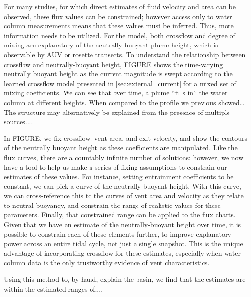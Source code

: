For many studies, for which direct estimates of fluid velocity and area can be observed, these flux values can be constrained; however access only to water column measurements means that these values must be inferred. Thus, more information needs to be utilized. For the \PHUMES model, both crossflow and degree of mixing are explanatory of the neutrally-buoyant plume height, which is observable by AUV or rosette transects. To understand the relationship between crossflow and neutrally-buoyant height, FIGURE shows the time-varying neutrally buoyant height as the current magnitude is swept according to the learned crossflow model presented in \cref{sec:external_current} for a mixed set of mixing coefficients. We can see that over time, a plume ``fills in'' the water column at different heights. When compared to the profile we previous showed\dots The structure may alternatively be explained from the presence of multiple sources....



In FIGURE, we fix crossflow, vent area, and exit velocity, and show the contours of the neutrally buoyant height as these coefficients are manipulated. Like the flux curves, there are a countably infinite number of solutions; however, we now have a tool to help us make a series of fixing assumptions to constrain our estimates of these values. For instance, setting entrainment coefficients to be constant, we can pick a curve of the neutrally-buoyant height. With this curve, we can cross-reference this to the curves of vent area and velocity as they relate to neutral buoyancy, and constrain the range of realistic values for these parameters. Finally, that constrained range can be applied to the flux charts. Given that we have an estimate of the neutrally-buoyant height over time, it is possible to constrain each of these elements further, to improve explanatory power across an entire tidal cycle, not just a single snapshot. This is the unique advantage of incorporating crossflow for these estimates, especially when water column data is the only trustworthy evidence of vent characteristics.

Using this method to, by hand, explain the basin, we find that the \PHUMES estimates are within the estimated ranges of....



